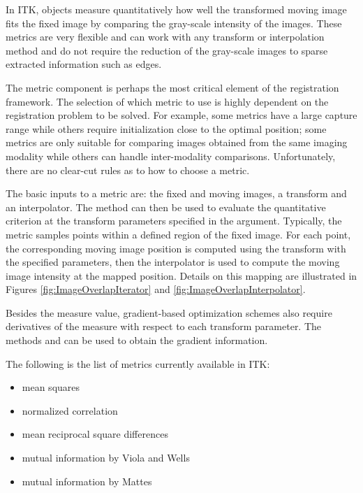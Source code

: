 %
%
%
%


In ITK,  objects measure quantitatively how well
the transformed moving image fits the fixed image by comparing the gray-scale
intensity of the images. These metrics are very flexible and can work with any
transform or interpolation method and do not require the reduction of the
gray-scale images to sparse extracted information such as edges.

The metric component is perhaps the most critical element of the registration
framework. The selection of which metric to use is highly dependent on the
registration problem to be solved. For example, some metrics have a large
capture range while others require initialization close to the optimal
position; some metrics are only suitable for comparing images obtained from the
same imaging modality while others can handle inter-modality comparisons.
Unfortunately, there are no clear-cut rules as to how to choose a metric.


The basic inputs to a metric are: the fixed and moving images, a transform and
an interpolator. The method  can then be used to evaluate the
quantitative criterion at the transform parameters specified in the argument.
Typically, the metric samples points within a defined region of the fixed
image.  For each point, the corresponding moving image position is computed
using the transform with the specified parameters, then the interpolator is
used to compute the moving image intensity at the mapped position. Details on
this mapping are illustrated in Figures \ref{fig:ImageOverlapIterator} and
\ref{fig:ImageOverlapInterpolator}. 

Besides the measure value, gradient-based optimization schemes also require
derivatives of the measure with respect to each transform parameter. The
methods  and  can be
used to obtain the gradient information.


The following is the list of metrics currently available in ITK:
\begin{itemize}
\item mean squares 
\item normalized correlation 
\item mean reciprocal square differences  
\item mutual information by Viola and Wells 
\item mutual information by Mattes 
\end{itemize}

